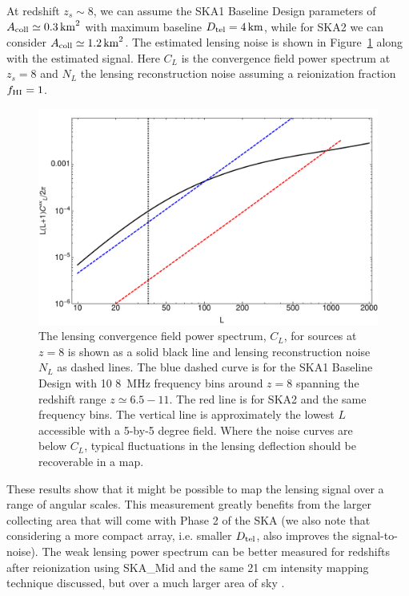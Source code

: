 \documentclass{PoS}
\begin{document}
At redshift $z_s \sim 8$, we can assume the SKA1 Baseline Design \cite{Dewdney:2013} parameters of $A_{\rm coll} \simeq 0.3  \, {\rm km}^2$ with maximum baseline $D_{\rm tel}=4 \, {\rm km}$, while for SKA2 we can consider $A_{\rm coll} \simeq 1.2  \, {\rm km}^2$.
The estimated lensing noise is shown in Figure~\ref{fig:CLNL} along with the estimated signal.  
Here $C_L$ is the convergence field power spectrum at $z_s=8$ and $N_L$ the lensing reconstruction noise assuming a reionization fraction $f_{\rm HI}=1$.
\begin{figure}[h]
\centerline{
\includegraphics[scale=0.6]{tomographic_SKA_kappaPS.pdf}
}
\caption{The lensing convergence field power spectrum, $C_L$, for sources at $z=8$ is shown as a solid black line and lensing reconstruction noise $N_L$ as dashed lines.  The blue dashed curve is for the SKA1 Baseline Design with 10 8~MHz frequency bins around $z=8$ spanning the redshift range $z \simeq 6.5-11$.  The red line is for SKA2 and the same frequency bins. The vertical line is approximately the lowest $L$ accessible with a 5-by-5 degree field.  Where the noise curves are below $C_L$, typical fluctuations in the lensing deflection should be recoverable in a map. }
\label{fig:CLNL}
\end{figure}

These results show that it might be possible to map the lensing signal over a range of angular scales.  This measurement greatly benefits from the larger collecting area that will come with Phase 2 of the SKA (we also note that  considering a more compact array, i.e. smaller $D_{\rm tel}$, also improves the signal-to-noise).  The weak lensing power spectrum can be better measured for redshifts after reionization using SKA\_Mid and the same 21 cm intensity mapping technique discussed, but over a much larger area of sky \cite{PourtsidouMetcalf:2014}.\\
\end{document}
